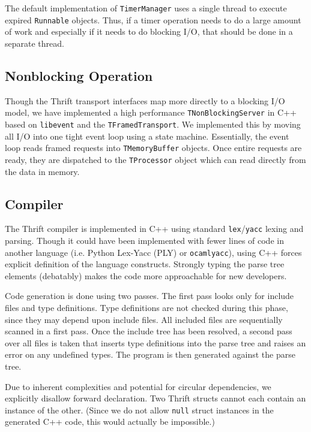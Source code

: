 \documentclass[nocopyrightspace,blockstyle]{sigplanconf}
\begin{document}
The default implementation of \texttt{TimerManager} uses a single thread to
execute expired \texttt{Runnable} objects. Thus, if a timer operation needs to
do a large amount of work and especially if it needs to do blocking I/O,
that should be done in a separate thread.

\subsection{Nonblocking Operation}
Though the Thrift transport interfaces map more directly to a blocking I/O
model, we have implemented a high performance \texttt{TNonBlockingServer}
in C++ based on \texttt{libevent} and the \texttt{TFramedTransport}. We
implemented this by moving all I/O into one tight event loop using a
state machine. Essentially, the event loop reads framed requests into
\texttt{TMemoryBuffer} objects. Once entire requests are ready, they are
dispatched to the \texttt{TProcessor} object which can read directly from
the data in memory.

\subsection{Compiler}
The Thrift compiler is implemented in C++ using standard \texttt{lex}/\texttt{yacc}
lexing and parsing. Though it could have been implemented with fewer
lines of code in another language (i.e. Python Lex-Yacc (PLY) or \texttt{ocamlyacc}), using C++
forces explicit definition of the language constructs. Strongly typing the
parse tree elements (debatably) makes the code more approachable for new
developers.

Code generation is done using two passes. The first pass looks only for
include files and type definitions. Type definitions are not checked during
this phase, since they may depend upon include files. All included files
are sequentially scanned in a first pass. Once the include tree has been
resolved, a second pass over all files is taken that inserts type definitions
into the parse tree and raises an error on any undefined types. The program is
then generated against the parse tree.

Due to inherent complexities and potential for circular dependencies,
we explicitly disallow forward declaration. Two Thrift structs cannot
each contain an instance of the other. (Since we do not allow \texttt{null}
struct instances in the generated C++ code, this would actually be impossible.)
\end{document}
